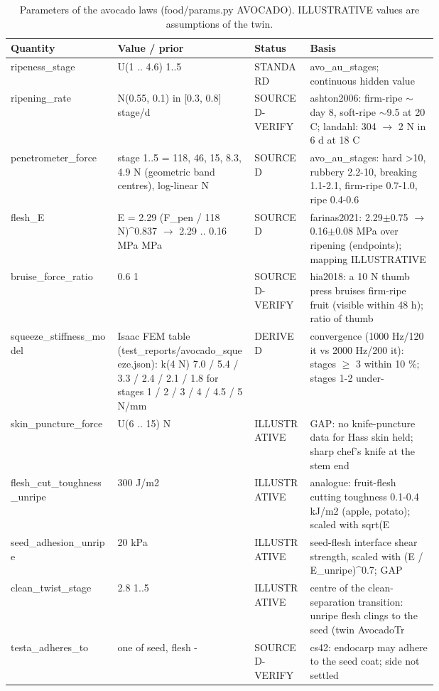 \documentclass[10.5pt,a4paper]{article}
\begin{document}
\begin{table}[htbp]\centering\scriptsize\caption{Parameters of the avocado laws (food/params.py AVOCADO). ILLUSTRATIVE values are assumptions of the twin.\label{tab:params}}
\begin{tabularx}{\linewidth}{@{}p{0.25\linewidth}p{0.32\linewidth}p{0.13\linewidth}X@{}}\toprule Quantity & Value / prior & Status & Basis \\\midrule
ripeness\_stage & U(1 .. 4.6) 1..5 & STANDARD & avo\_au\_stages; continuous hidden value \\
ripening\_rate & N(0.55, 0.1) in [0.3, 0.8] stage/d & SOURCED-VERIFY & ashton2006: firm-ripe $\sim$day 8, soft-ripe $\sim$9.5 at 20 C; landahl: 304 $\to$ 2 N in 6 d at 18 C \\
penetrometer\_force & stage 1..5 = 118, 46, 15, 8.3, 4.9 N (geometric band centres), log-linear N & SOURCED & avo\_au\_stages: hard >10, rubbery 2.2-10, breaking 1.1-2.1, firm-ripe 0.7-1.0, ripe 0.4-0.6 \\
flesh\_E & E = 2.29 (F\_pen / 118 N)\^{}0.837 $\to$ 2.29 .. 0.16 MPa MPa & SOURCED & farinas2021: 2.29$\pm$0.75 $\to$ 0.16$\pm$0.08 MPa over ripening (endpoints); mapping ILLUSTRATIVE \\
bruise\_force\_ratio & 0.6 1 & SOURCED-VERIFY & hia2018: a 10 N thumb press bruises firm-ripe fruit (visible within 48 h); ratio of thumb  \\
squeeze\_stiffness\_model & Isaac FEM table (test\_reports/avocado\_squeeze.json): k(4 N) 7.0 / 5.4 / 3.3 / 2.4 / 2.1 / 1.8 for stages 1 / 2 / 3 / 4 / 4.5 / 5 N/mm & DERIVED & convergence (1000 Hz/120 it vs 2000 Hz/200 it): stages $\ge$ 3 within 10 \%; stages 1-2 under- \\
skin\_puncture\_force & U(6 .. 15) N & ILLUSTRATIVE & GAP: no knife-puncture data for Hass skin held; sharp chef's knife at the stem end \\
flesh\_cut\_toughness\_unripe & 300 J/m2 & ILLUSTRATIVE & analogue: fruit-flesh cutting toughness 0.1-0.4 kJ/m2 (apple, potato); scaled with sqrt(E  \\
seed\_adhesion\_unripe & 20 kPa & ILLUSTRATIVE & seed-flesh interface shear strength, scaled with (E / E\_unripe)\^{}0.7; GAP \\
clean\_twist\_stage & 2.8 1..5 & ILLUSTRATIVE & centre of the clean-separation transition: unripe flesh clings to the seed (twin AvocadoTr \\
testa\_adheres\_to & one of seed, flesh - & SOURCED-VERIFY & cs42: endocarp may adhere to the seed coat; side not settled \\

\end{tabularx}
\end{table}
\end{document}
